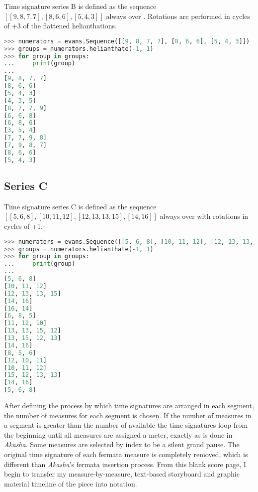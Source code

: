 Time signature series B is defined as the sequence $[[9, 8, 7, 7], [8, 6, 6], [5, 4, 3]]$ always over . Rotations are performed in cycles of +3 of the flattened helianthations.

\begin{lstlisting}[language=Python,frame=tb,caption={Enumeration of helianthated rotations of time signature series B in Polillas},label=lst:p-sigs-b]
>>> numerators = evans.Sequence([[9, 8, 7, 7], [8, 6, 6], [5, 4, 3]])
>>> groups = numerators.helianthate(-1, 1)
>>> for group in groups:
...     print(group)
...
[9, 8, 7, 7]
[8, 6, 6]
[5, 4, 3]
[4, 3, 5]
[8, 7, 7, 9]
[6, 6, 8]
[6, 8, 6]
[3, 5, 4]
[7, 7, 9, 8]
[7, 9, 8, 7]
[8, 6, 6]
[5, 4, 3]
\end{lstlisting}

\subsection{Series C}

Time signature series C is defined as the sequence $[[5, 6, 8], [10, 11, 12], [12, 13, 13, 15], [14, 16]]$ always over  with rotations in cycles of +1. \vspace{0.5cm}

\begin{lstlisting}[language=Python,frame=tb,caption={Enumeration of helianthated rotations of time signature series C in Polillas},label=lst:p-sigs-c]
>>> numerators = evans.Sequence([[5, 6, 8], [10, 11, 12], [12, 13, 13, 15], [14, 16]])
>>> groups = numerators.helianthate(-1, 1)
>>> for group in groups:
...     print(group)
...
[5, 6, 8]
[10, 11, 12]
[12, 13, 13, 15]
[14, 16]
[16, 14]
[6, 8, 5]
[11, 12, 10]
[13, 13, 15, 12]
[13, 15, 12, 13]
[14, 16]
[8, 5, 6]
[12, 10, 11]
[10, 11, 12]
[15, 12, 13, 13]
[14, 16]
[5, 6, 8]
\end{lstlisting}

After defining the process by which time signatures are arranged in each segment, the number of measures for each segment is chosen. If the number of measures in a segment is greater than the number of available the time signatures loop from the beginning until all measures are assigned a meter, exactly as is done in \textit{Akasha}. Some measures are selected by index to be a silent grand pause. The original time signature of each fermata measure is completely removed, which is different than \textit{Akasha}'s fermata insertion process. From this blank score page, I begin to transfer my measure-by-measure, text-based storyboard and graphic material timeline of the piece into notation.

